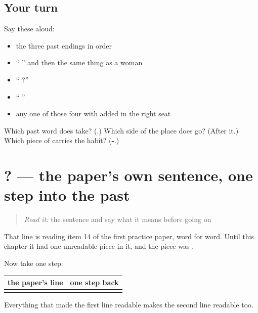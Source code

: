\subsection*{Your turn}
Say these aloud:

\begin{itemize}
\raggedright
  \item the three past endings in order
  \item \textquotedblleft{}   \textquotedblright{} and then the same thing as a woman
  \item \textquotedblleft{}  ?\textquotedblright{}
  \item \textquotedblleft{}   \textquotedblright{}
  \item any one of those four with  added in the right seat
\end{itemize}

\begin{tcolorbox}[breakable,colback=teal!4,colframe=teal!35!black,title={Before you move on}]
Which past word does  take? (\textbf{}.) Which side of the place does  go? (After it.) Which piece of \emph{ } carries the habit? (\textbf{-}.)
\end{tcolorbox}
\section[\texorpdfstring{\hi{आप} \hi{कहाँ} \hi{थे}? (āp kahā̃ the?)}{आप कहाँ थे? (āp kahā̃ the?)}]{  ? — the paper's own sentence, one step into the past}

\label{lesson:HI-C87-sintesis-atit}



\begin{quote}
\emph{Read it:} the sentence and say what it means before going on

\begin{quote}
   
\end{quote}
\end{quote}

\begin{grammarlens}[title={Grammar Lens: the sentence a paper prints}]
That line is reading item 14 of the first practice paper, word for word. Until this chapter it had one unreadable piece in it, and the piece was \textbf{}.

Now take one step:

\noindent
\begin{tabularx}{\linewidth}{@{}>{\raggedright\arraybackslash}X>{\raggedright\arraybackslash}X@{}}
\toprule
\textbf{the paper's line} & \textbf{one step back} \\
\midrule
\hi{मैं} \hi{घर} \hi{पर} \hi{हूँ।} & \hi{मैं} \hi{घर} \hi{पर} \hi{था।} \\
\bottomrule
\end{tabularx}

Everything that made the first line readable makes the second line readable too.
\end{grammarlens}

